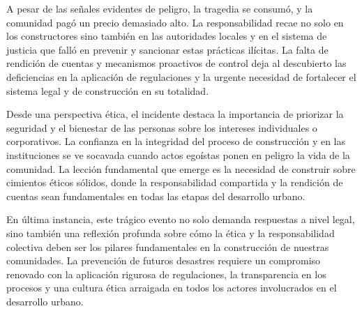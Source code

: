 \documentclass[letterpaper, 12pt]{article}
\begin{document}
A pesar de las señales evidentes de peligro, la tragedia se
consumó, y la comunidad pagó un precio demasiado alto. La
responsabilidad recae no solo en los constructores sino
también en las autoridades locales y en el sistema de
justicia que falló en prevenir y sancionar estas prácticas
ilícitas. La falta de rendición de cuentas y mecanismos
proactivos de control deja al descubierto las deficiencias
en la aplicación de regulaciones y la urgente necesidad de
fortalecer el sistema legal y de construcción en su
totalidad.

Desde una perspectiva ética, el incidente destaca la
importancia de priorizar la seguridad y el bienestar de las
personas sobre los intereses individuales o corporativos.
La confianza en la integridad del proceso de construcción y
en las instituciones se ve socavada cuando actos egoístas
ponen en peligro la vida de la comunidad. La lección
fundamental que emerge es la necesidad de construir sobre
cimientos éticos sólidos, donde la responsabilidad
compartida y la rendición de cuentas sean fundamentales en
todas las etapas del desarrollo urbano.

En última instancia, este trágico evento no solo demanda
respuestas a nivel legal, sino también una reflexión
profunda sobre cómo la ética y la responsabilidad colectiva
deben ser los pilares fundamentales en la construcción de
nuestras comunidades. La prevención de futuros desastres
requiere un compromiso renovado con la aplicación rigurosa
de regulaciones, la transparencia en los procesos y una
cultura ética arraigada en todos los actores involucrados
en el desarrollo urbano.

\printbibliography
\end{document}
